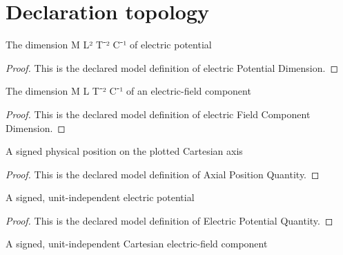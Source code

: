 \section{Declaration topology}
\begin{definition}
  \label{def:physics:phyx-mini-0875:phyxminiproblems-problemphyxmini0875-electricpotentialdimension}
  The dimension M L² T⁻² C⁻¹ of electric potential
\end{definition}
\begin{proof}
  This is the declared model definition of electric Potential Dimension.
\end{proof}
\begin{definition}
  \label{def:physics:phyx-mini-0875:phyxminiproblems-problemphyxmini0875-electricfieldcomponentdimension}
  The dimension M L T⁻² C⁻¹ of an electric-field component
\end{definition}
\begin{proof}
  This is the declared model definition of electric Field Component Dimension.
\end{proof}
\begin{definition}
  \label{def:physics:phyx-mini-0875:phyxminiproblems-problemphyxmini0875-axialpositionquantity}
  A signed physical position on the plotted Cartesian axis
\end{definition}
\begin{proof}
  This is the declared model definition of Axial Position Quantity.
\end{proof}
\begin{definition}
  \label{def:physics:phyx-mini-0875:phyxminiproblems-problemphyxmini0875-electricpotentialquantity}
  A signed, unit-independent electric potential
\end{definition}
\begin{proof}
  This is the declared model definition of Electric Potential Quantity.
\end{proof}
\begin{definition}
  \label{def:physics:phyx-mini-0875:phyxminiproblems-problemphyxmini0875-electricfieldcomponentquantity}
  A signed, unit-independent Cartesian electric-field component
\end{definition}
